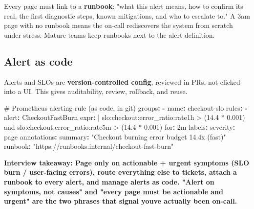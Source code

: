 \documentclass[11pt]{article}
\newenvironment{Shaded}{\begin{snugshade}}{\end{snugshade}}
\newcommand{\AttributeTok}[1]{\textcolor[rgb]{0.16,0.50,0.73}{#1}}
\newcommand{\CharTok}[1]{\textcolor[rgb]{0.24,0.68,0.91}{#1}}
\newcommand{\CommentTok}[1]{\textcolor[rgb]{0.48,0.49,0.49}{#1}}
\newcommand{\FunctionTok}[1]{\textcolor[rgb]{0.56,0.27,0.68}{#1}}
\newcommand{\KeywordTok}[1]{\textcolor[rgb]{0.81,0.81,0.76}{\textbf{#1}}}
\newcommand{\NormalTok}[1]{\textcolor[rgb]{0.81,0.81,0.76}{#1}}
\newcommand{\StringTok}[1]{\textcolor[rgb]{0.96,0.31,0.31}{#1}}
\begin{document}
Every page must link to a \textbf{runbook}: "what this alert means, how to confirm it\textquotesingle s real, the first diagnostic steps, known mitigations, and who to escalate to." A 3am page with no runbook means the on-call rediscovers the system from scratch under stress. Mature teams keep runbooks next to the alert definition.

\subsection{Alert as code}\label{alert-as-code}

Alerts and SLOs are \textbf{version-controlled config}, reviewed in PRs, not clicked into a UI. This gives auditability, review, rollback, and reuse.


\begin{Shaded}
\begin{Highlighting}[]
\CommentTok{\# Prometheus alerting rule (as code, in git)}
\FunctionTok{groups}\KeywordTok{:}
\KeywordTok{{-}}\AttributeTok{ }\FunctionTok{name}\KeywordTok{:}\AttributeTok{ checkout{-}slo}
\AttributeTok{  }\FunctionTok{rules}\KeywordTok{:}
\AttributeTok{  }\KeywordTok{{-}}\AttributeTok{ }\FunctionTok{alert}\KeywordTok{:}\AttributeTok{ CheckoutFastBurn}
\FunctionTok{    expr}\KeywordTok{: }\CharTok{|}
\NormalTok{      slo:checkout:error\_ratio:rate1h \textgreater{} (14.4 * 0.001)}
\NormalTok{      and}
\NormalTok{      slo:checkout:error\_ratio:rate5m \textgreater{} (14.4 * 0.001)}
\AttributeTok{    }\FunctionTok{for}\KeywordTok{:}\AttributeTok{ 2m}
\AttributeTok{    }\FunctionTok{labels}\KeywordTok{:}
\AttributeTok{      }\FunctionTok{severity}\KeywordTok{:}\AttributeTok{ page}
\AttributeTok{    }\FunctionTok{annotations}\KeywordTok{:}
\AttributeTok{      }\FunctionTok{summary}\KeywordTok{:}\AttributeTok{ }\StringTok{"Checkout burning error budget 14.4x (fast)"}
\AttributeTok{      }\FunctionTok{runbook}\KeywordTok{:}\AttributeTok{ }\StringTok{"https://runbooks.internal/checkout{-}fast{-}burn"}
\end{Highlighting}
\end{Shaded}

\textbf{Interview takeaway: Page only on actionable + urgent symptoms (SLO burn / user-facing errors), route everything else to tickets, attach a runbook to every alert, and manage alerts as code. "Alert on symptoms, not causes" and "every page must be actionable and urgent" are the two phrases that signal you\textquotesingle ve actually been on-call.}
\end{document}
